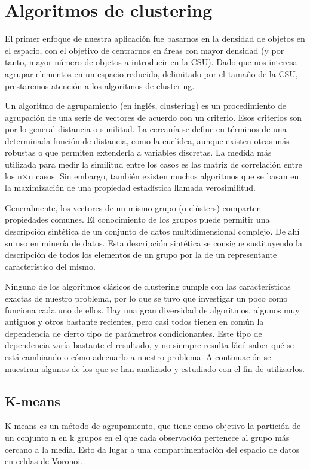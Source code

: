 \section{Algoritmos de clustering}
El primer enfoque de nuestra aplicación fue basarnos en la densidad de objetos
en el espacio, con el objetivo de centrarnos en áreas con mayor densidad (y por 
tanto, mayor número de objetos a introducir en la CSU). Dado que nos interesa 
agrupar elementos en un espacio reducido, delimitado por el tamaño de la CSU,
prestaremos atención a los algoritmos de clustering.

Un algoritmo de agrupamiento (en inglés, clustering) es un procedimiento de 
agrupación de una serie de vectores de acuerdo con un criterio. Esos criterios
son por lo general distancia o similitud. La cercanía se define en términos de
una determinada función de distancia, como la euclídea, aunque existen otras más
robustas o que permiten extenderla a variables discretas. La medida más
utilizada para medir la similitud entre los casos es las matriz de correlación 
entre los n$\times$n casos. Sin embargo, también existen muchos algoritmos que
se basan en la maximización de una propiedad estadística llamada verosimilitud.

Generalmente, los vectores de un mismo grupo (o clústers) comparten propiedades
comunes. El conocimiento de los grupos puede permitir una descripción sintética
de un conjunto de datos multidimensional complejo. De ahí su uso en minería de 
datos. Esta descripción sintética se consigue sustituyendo la descripción de 
todos los elementos de un grupo por la de un representante característico del 
mismo.

Ninguno de los algoritmos clásicos de clustering cumple con las características
exactas de nuestro problema, por lo que se tuvo que investigar un poco como
funciona cada uno de ellos. Hay una gran diversidad de algoritmos, algunos muy
antiguos y otros bastante recientes, pero casi todos tienen en común la
dependencia de cierto tipo de parámetros condicionantes. Este tipo de
dependencia varía bastante el resultado, y no siempre resulta fácil saber qué se
está cambiando o cómo adecuarlo a nuestro problema. A continuación se muestran
algunos de los que se han analizado y estudiado con el fin de utilizarlos.

\subsection{K-means}

K-means \cite{Hartigan:1979:KMC} es un método de agrupamiento, que tiene como
objetivo la partición de un conjunto n en k grupos en el que cada observación
pertenece al grupo más cercano a la media. Esto da lugar a una 
compartimentación del espacio de datos en celdas de Voronoi.

